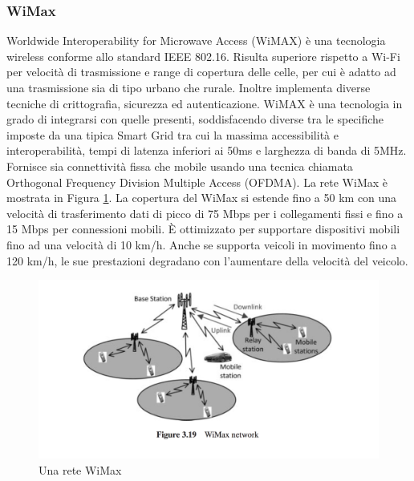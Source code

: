 \subsubsection{WiMax}
Worldwide Interoperability for Microwave Access (WiMAX) è una tecnologia wireless conforme allo standard IEEE 802.16. Risulta superiore rispetto a Wi-Fi per velocità di trasmissione e range di copertura delle celle, per cui è adatto ad una trasmissione sia di tipo urbano che rurale. Inoltre implementa diverse tecniche di crittografia, sicurezza ed autenticazione. WiMAX è una tecnologia in grado di integrarsi con quelle presenti, soddisfacendo diverse tra le specifiche imposte da una tipica Smart Grid tra cui la massima accessibilità e interoperabilità, tempi di latenza inferiori ai 50ms e larghezza di banda di 5MHz. Fornisce sia connettività fissa che mobile usando una tecnica chiamata Orthogonal Frequency Division Multiple Access (OFDMA). La rete WiMax è mostrata in Figura \ref{fig:wim}. La copertura del WiMax si estende fino a 50 km con una velocità di trasferimento dati di picco di 75 Mbps per i collegamenti fissi e fino a 15 Mbps per connessioni mobili. È ottimizzato per supportare dispositivi mobili fino ad una velocità di 10 km/h. Anche se supporta veicoli in movimento fino a 120 km/h, le sue prestazioni degradano con l'aumentare della velocità del veicolo.
\begin{figure}[h]
	\centering
	\includegraphics[scale=0.350]{imgs/wim.png}
	\caption{Una rete WiMax} \label{fig:wim}
\end{figure}
